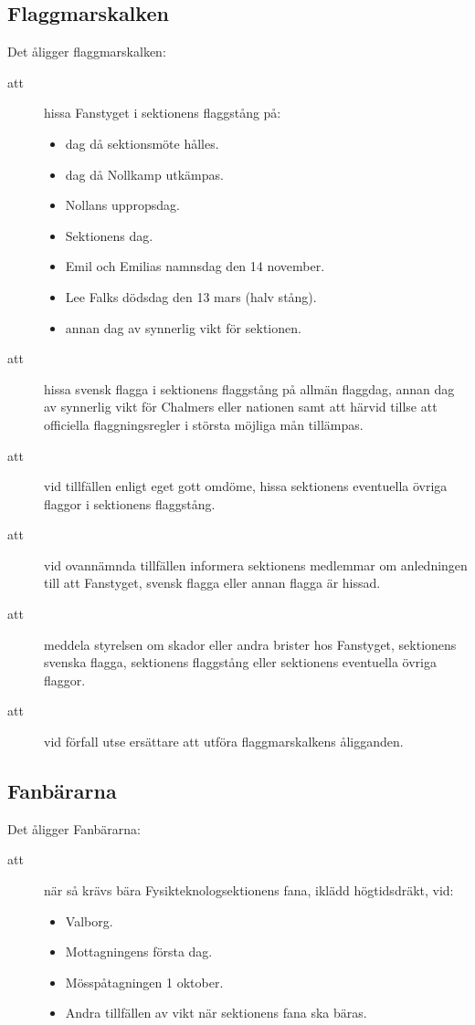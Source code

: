 \documentclass[a4paper]{article}
\begin{document}
\begin{foreningenv}{\forening{}}
    \subsection{Flaggmarskalken}
    Det åligger flaggmarskalken:
    \begin{description}
        \item[att] hissa Fanstyget i sektionens flaggstång på:
        \begin{itemize}
            \item dag då sektionsmöte hålles.
            \item dag då Nollkamp utkämpas.
            \item Nollans uppropsdag.
            \item Sektionens dag.
            \item Emil och Emilias namnsdag den 14 november.
            \item Lee Falks dödsdag den 13 mars (halv stång).
            \item annan dag av synnerlig vikt för sektionen.
        \end{itemize}
        \item[att] hissa svensk flagga i sektionens flaggstång på allmän flaggdag, annan dag av synnerlig vikt för Chalmers eller nationen samt att härvid tillse att officiella flaggningsregler i största möjliga mån tillämpas.
        \item[att] vid tillfällen enligt eget gott omdöme, hissa sektionens eventuella övriga flaggor i sektionens flaggstång.
        \item[att] vid ovannämnda tillfällen informera sektionens medlemmar om anledningen till att Fanstyget, svensk flagga eller annan flagga är hissad.
        \item[att] meddela styrelsen om skador eller andra brister hos Fanstyget, sektionens svenska flagga, sektionens flaggstång eller sektionens eventuella övriga flaggor.
        \item[att] vid förfall utse ersättare att utföra flaggmarskalkens åligganden.
    \end{description}
    
    \subsection{Fanbärarna}
    Det åligger Fanbärarna:
    \begin{description}
        \item[att] när så krävs bära Fysikteknologsektionens fana, iklädd högtidsdräkt, vid:
        \begin{itemize}
    	    \item Valborg.
    	    \item Mottagningens första dag.
    	    \item Mösspåtagningen 1 oktober.
    	    \item Andra tillfällen av vikt när sektionens fana ska bäras.
    	\end{itemize}
    \end{description}
\end{foreningenv}
\end{document}
